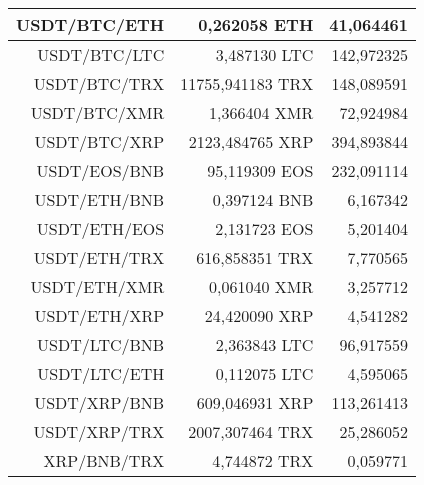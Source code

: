 \begin{table}
\begin{tabular}{|| r | r | r ||}
 \hline USDT/BTC/ETH & 0,262058 ETH & 41,064461\\ 
 \hline USDT/BTC/LTC & 3,487130 LTC & 142,972325\\ 
 \hline USDT/BTC/TRX & 11755,941183 TRX & 148,089591\\ 
 \hline USDT/BTC/XMR & 1,366404 XMR & 72,924984\\ 
 \hline USDT/BTC/XRP & 2123,484765 XRP & 394,893844\\ 
 \hline USDT/EOS/BNB & 95,119309 EOS & 232,091114\\ 
 \hline USDT/ETH/BNB & 0,397124 BNB & 6,167342\\ 
 \hline USDT/ETH/EOS & 2,131723 EOS & 5,201404\\ 
 \hline USDT/ETH/TRX & 616,858351 TRX & 7,770565\\ 
 \hline USDT/ETH/XMR & 0,061040 XMR & 3,257712\\ 
 \hline USDT/ETH/XRP & 24,420090 XRP & 4,541282\\ 
 \hline USDT/LTC/BNB & 2,363843 LTC & 96,917559\\ 
 \hline USDT/LTC/ETH & 0,112075 LTC & 4,595065\\ 
 \hline USDT/XRP/BNB & 609,046931 XRP & 113,261413\\ 
 \hline USDT/XRP/TRX & 2007,307464 TRX & 25,286052\\ 
 \hline XRP/BNB/TRX & 4,744872 TRX & 0,059771\\ 
 \hline
\end{tabular}
\end{table}